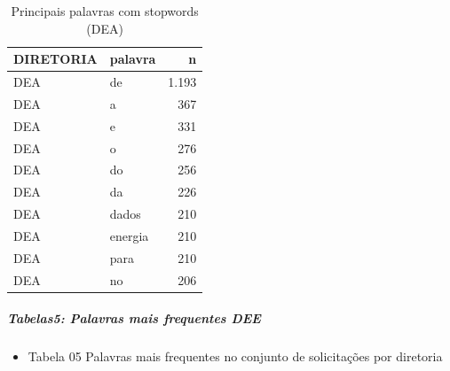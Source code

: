 \documentclass[]{article}
\newenvironment{Shaded}{\begin{snugshade}}{\end{snugshade}}
\newcommand{\KeywordTok}[1]{\textcolor[rgb]{0.13,0.29,0.53}{\textbf{#1}}}
\newcommand{\DataTypeTok}[1]{\textcolor[rgb]{0.13,0.29,0.53}{#1}}
\newcommand{\DecValTok}[1]{\textcolor[rgb]{0.00,0.00,0.81}{#1}}
\newcommand{\StringTok}[1]{\textcolor[rgb]{0.31,0.60,0.02}{#1}}
\newcommand{\OperatorTok}[1]{\textcolor[rgb]{0.81,0.36,0.00}{\textbf{#1}}}
\newcommand{\NormalTok}[1]{#1}
\providecommand{\tightlist}{%
  \setlength{\itemsep}{0pt}\setlength{\parskip}{0pt}}
\let\oldsubparagraph\subparagraph
\renewcommand{\subparagraph}[1]{\oldsubparagraph{#1}\mbox{}}
\begin{document}
\begin{table}[!h]

\caption{\label{tab:unnamed-chunk-25}Principais palavras com stopwords (DEA)}
\centering
\begin{tabular}{llr}
\toprule
DIRETORIA & palavra & n\\
\midrule
\rowcolor{gray!6}  DEA & de & 1.193\\
DEA & a & 367\\
\rowcolor{gray!6}  DEA & e & 331\\
DEA & o & 276\\
\rowcolor{gray!6}  DEA & do & 256\\
\addlinespace
DEA & da & 226\\
\rowcolor{gray!6}  DEA & dados & 210\\
DEA & energia & 210\\
\rowcolor{gray!6}  DEA & para & 210\\
DEA & no & 206\\
\bottomrule
\end{tabular}
\end{table}

\subparagraph{Tabelas5: Palavras mais frequentes
DEE}\label{tabelas5-palavras-mais-frequentes-dee}

\begin{itemize}
\tightlist
\item
  Tabela 05 Palavras mais frequentes no conjunto de solicitações por
  diretoria
\end{itemize}

\begin{Shaded}
\end{Shaded}
\end{document}
